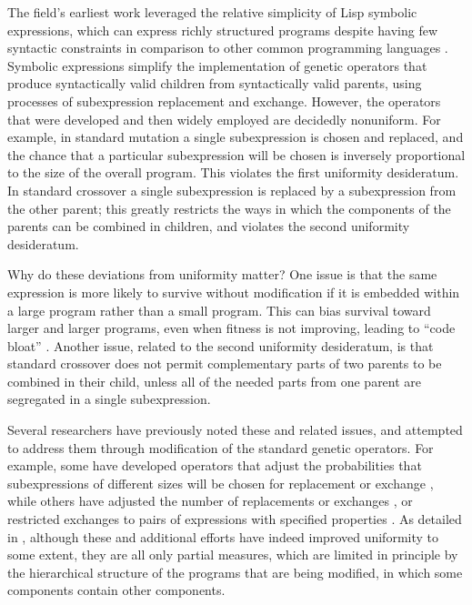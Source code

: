 \documentclass[graybox]{svmult}
\begin{document}
The field's earliest work leveraged the relative simplicity of Lisp symbolic expressions, which can express richly structured programs despite having few syntactic constraints in comparison to other common programming languages \cite{koza:book}. Symbolic expressions simplify the implementation of genetic operators that produce syntactically valid children from syntactically valid parents, using processes of subexpression replacement and exchange. However, the operators that were developed and then widely employed are decidedly nonuniform. For example, in standard mutation a single subexpression is chosen and replaced, and the chance that a particular subexpression will be chosen is inversely proportional to the size of the overall program. This violates the first uniformity desideratum. In standard crossover a single subexpression is replaced by a subexpression from the other parent; this greatly restricts the ways in which the components of the parents can be combined in children, and violates the second uniformity desideratum.

Why do these deviations from uniformity matter? One issue is that the same expression is more likely to survive without modification if it is embedded within a large program rather than a small program. This can bias survival toward larger and larger programs, even when fitness is not improving, leading to ``code bloat'' \cite{Luke:2006:EC:FIXED}. Another issue, related to the second uniformity desideratum, is that standard crossover does not permit complementary parts of two parents to be combined in their child, unless all of the needed parts from one parent are segregated in a single subexpression.

Several researchers have previously noted these and related issues, and attempted to address them through modification of the standard genetic operators. For example, some have developed operators that adjust the probabilities that subexpressions of different sizes will be chosen for replacement or exchange \cite{koza:book,Helmuth:2011:GECCOcomp}, while others have adjusted the number of replacements or exchanges \cite{vanbelle:2002:EuroGP:NOERROR}, or restricted exchanges to pairs of expressions with specified properties \cite{page:CSRP-98-20,poli:1998:local,poli:2000:22par}. As detailed in \cite{Spector:2013:GPTP}, although these and additional efforts have indeed improved uniformity to some extent, they are all only partial measures, which are limited in principle by the hierarchical structure of the programs that are being modified, in which some components contain other components.
\end{document}

